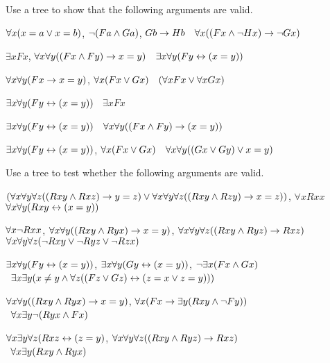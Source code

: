 \documentclass[PHIL101-Textbook.tex]{subfiles}
\begin{document}
\noindent\solutions
\problempart
\label{pr.identity.trees.validity}
Use a tree to show that the following arguments are valid.
\begin{earg}
\item $\forall x (x=a \vee x=b)$, $\neg(Fa \land Ga)$, $Gb \rightarrow Hb$ \therefore\ $\forall x ((Fx \land \neg Hx) \rightarrow \neg Gx)$ %
\item $\exists x Fx$, $\forall x \forall y ((Fx \land Fy) \rightarrow x=y)$ \therefore\ $\exists x \forall y (Fy \leftrightarrow (x=y))$ %
\item $\forall x \forall y (Fx \rightarrow x=y)$, $\forall x(Fx \vee Gx)$ \therefore\ $(\forall x Fx \vee \forall x Gx)$ %
\item $\exists x \forall y (Fy \leftrightarrow (x=y))$ \therefore\ $\exists x Fx$ %
\item $\exists x \forall y(Fy \leftrightarrow (x=y))$ \therefore\ $\forall x \forall y ((Fx \land Fy)\rightarrow (x=y))$ %
\item $\exists x \forall y(Fy \leftrightarrow(x=y))$, $\forall x(Fx \vee Gx)$ \therefore\ $\forall x \forall y((Gx \vee Gy) \vee x=y)$ %
\end{earg} %

\noindent\problempart
\label{pr.identity.trees.relations}
Use a tree to test whether the following arguments are valid.
\begin{earg}
\item $(\forall x\forall y \forall z((Rxy \land Rxz) \rightarrow y=z) \vee \forall x\forall y \forall z((Rxy \land Rzy) \rightarrow x=z))$, $\forall x Rxx$ \therefore\ $\forall x \forall y (Rxy \leftrightarrow (x=y))$ %
\item $\forall x \neg Rxx$, $\forall x \forall y((Rxy \land Ryx) \rightarrow x=y)$, $\forall x \forall y \forall z((Rxy \land Ryz)\rightarrow Rxz)$ \therefore\ $\forall x \forall y \forall z (\neg Rxy \vee \neg Ryz \vee \neg Rzx)$ %
\item $\exists x \forall y (Fy \leftrightarrow (x=y))$, $\exists x \forall y (Gy \leftrightarrow (x=y))$, $\neg \exists x (Fx \land Gx)$\\ \indent \therefore\ $\exists x \exists y (x \neq y \land \forall z((Fz \vee Gz) \leftrightarrow (z=x \vee z=y)))$ %
\item $\forall x \forall y ((Rxy \land Ryx) \rightarrow x=y)$, $\forall x (Fx \rightarrow \exists y(Rxy \land \neg Fy))$\\ \indent \therefore\ $\forall x \exists y \neg (Ryx \land Fx)$ %
\item $\forall x \exists y \forall z (Rxz \leftrightarrow (z=y)$, $\forall x \forall y \forall z((Rxy \land Ryz)\rightarrow Rxz)$\\ \indent \therefore\ $\forall x \exists y (Rxy \land Ryx)$ %
\end{earg}
\end{document}
